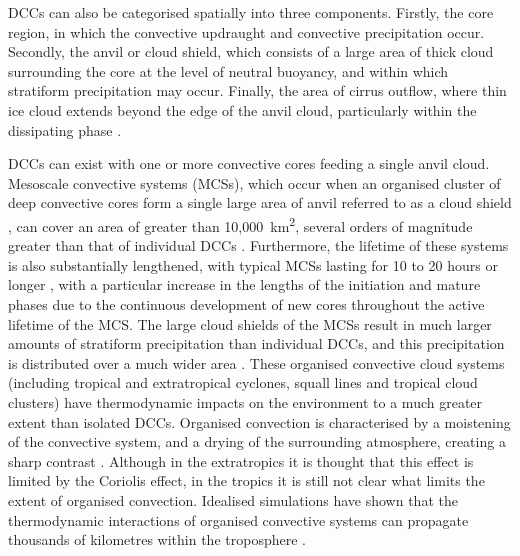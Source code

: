 DCCs can also be categorised spatially into three components.
Firstly, the core region, in which the convective updraught and convective precipitation occur.
Secondly, the anvil or cloud shield, which consists of a large area of thick cloud surrounding the core at the level of neutral buoyancy, and within which stratiform precipitation may occur.
Finally, the area of cirrus outflow, where thin ice cloud extends beyond the edge of the anvil cloud, particularly within the dissipating phase \citep{lilly_cirrus_1988}.

DCCs can exist with one or more convective cores feeding a single anvil cloud.
Mesoscale convective systems (MCSs), which occur when an organised cluster of deep convective cores form a single large area of anvil referred to as a cloud shield \citep{roca_simple_2017}, can cover an area of greater than 10,000~km\textsuperscript{2}, several orders of magnitude greater than that of individual DCCs \citep{houze_mesoscale_2004}.
Furthermore, the lifetime of these systems is also substantially lengthened, with typical MCSs lasting for 10 to 20 hours or longer \citep{chen_diurnal_1997}, with a particular increase in the lengths of the initiation and mature phases \citep{wall_life_2018} due to the continuous development of new cores throughout the active lifetime of the MCS.
The large cloud shields of the MCSs result in much larger amounts of stratiform precipitation than individual DCCs, and this precipitation is distributed over a much wider area \citep{houze_chapter_2014}.
These organised convective cloud systems (including tropical and extratropical cyclones, squall lines and tropical cloud clusters) have thermodynamic impacts on the environment to a much greater extent than isolated DCCs.
Organised convection is characterised by a moistening of the convective system, and a drying of the surrounding atmosphere, creating a sharp contrast \citep{houze_chapter_2014}.
Although in the extratropics it is thought that this effect is limited by the Coriolis effect, in the tropics it is still not clear what limits the extent of organised convection.
Idealised simulations have shown that the thermodynamic interactions of organised convective systems can propagate thousands of kilometres within the troposphere \citep{beucler_budget_2019}.

